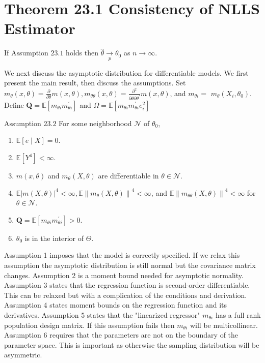\documentclass[10pt]{article}
\begin{document}
\section{Theorem 23.1 Consistency of NLLS Estimator}
If Assumption $23.1$ holds then $\widehat{\theta} \underset{p}{\longrightarrow} \theta_{0}$ as $n \rightarrow \infty$.

We next discuss the asymptotic distribution for differentiable models. We first present the main result, then discuss the assumptions. Set $m_{\theta}(x, \theta)=\frac{\partial}{\partial \theta} m(x, \theta), m_{\theta \theta}(x, \theta)=\frac{\partial^{2}}{\partial \theta \partial \theta^{\prime}} m(x, \theta)$, and $m_{\theta i}=$ $m_{\theta}\left(X_{i}, \theta_{0}\right)$. Define $\boldsymbol{Q}=\mathbb{E}\left[m_{\theta i} m_{\theta i}^{\prime}\right]$ and $\Omega=\mathbb{E}\left[m_{\theta i} m_{\theta i}^{\prime} e_{i}^{2}\right]$

Assumption $23.2$ For some neighborhood $\mathscr{N}$ of $\theta_{0}$,

\begin{enumerate}
  \item $\mathbb{E}[e \mid X]=0$.

  \item $\mathbb{E}\left[Y^{4}\right]<\infty$.

  \item $m(x, \theta)$ and $m_{\theta}(X, \theta)$ are differentiable in $\theta \in \mathcal{N}$.

  \item $\mathbb{E}|m(X, \theta)|^{4}<\infty, \mathbb{E}\left\|m_{\theta}(X, \theta)\right\|^{4}<\infty$, and $\mathbb{E}\left\|m_{\theta \theta}(X, \theta)\right\|^{4}<\infty$ for $\theta \in \mathcal{N}$.

  \item $\boldsymbol{Q}=\mathbb{E}\left[m_{\theta i} m_{\theta i}^{\prime}\right]>0$.

  \item $\theta_{0}$ is in the interior of $\Theta$.

\end{enumerate}
Assumption 1 imposes that the model is correctly specified. If we relax this assumption the asymptotic distribution is still normal but the covariance matrix changes. Assumption 2 is a moment bound needed for asymptotic normality. Assumption 3 states that the regression function is second-order differentiable. This can be relaxed but with a complication of the conditions and derivation. Assumption 4 states moment bounds on the regression function and its derivatives. Assumption 5 states that the "linearized regressor" $m_{\theta i}$ has a full rank population design matrix. If this assumption fails then $m_{\theta i}$ will be multicollinear. Assumption 6 requires that the parameters are not on the boundary of the parameter space. This is important as otherwise the sampling distribution will be asymmetric.
\end{document}
